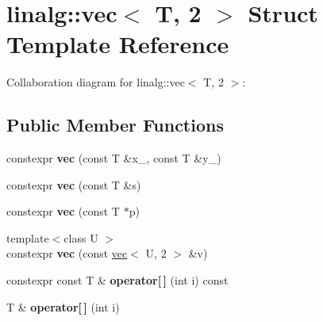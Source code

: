 \hypertarget{structlinalg_1_1vec_3_01T_00_012_01_4}{}\section{linalg\+:\+:vec$<$ T, 2 $>$ Struct Template Reference}
\label{structlinalg_1_1vec_3_01T_00_012_01_4}


Collaboration diagram for linalg\+:\+:vec$<$ T, 2 $>$\+:
\subsection*{Public Member Functions}
\begin{DoxyCompactItemize}
\item 
constexpr {\bfseries vec} (const T \&x\+\_\+, const T \&y\+\_\+)\hypertarget{structlinalg_1_1vec_3_01T_00_012_01_4_afc77c05c12561a24238f5efd47b0f9a1}{}\label{structlinalg_1_1vec_3_01T_00_012_01_4_afc77c05c12561a24238f5efd47b0f9a1}

\item 
constexpr {\bfseries vec} (const T \&s)\hypertarget{structlinalg_1_1vec_3_01T_00_012_01_4_ac565acdbde274b5456b157b07f1f90bd}{}\label{structlinalg_1_1vec_3_01T_00_012_01_4_ac565acdbde274b5456b157b07f1f90bd}

\item 
constexpr {\bfseries vec} (const T $\ast$p)\hypertarget{structlinalg_1_1vec_3_01T_00_012_01_4_a4704fbe1fda481d91d0c09d94a74e0c4}{}\label{structlinalg_1_1vec_3_01T_00_012_01_4_a4704fbe1fda481d91d0c09d94a74e0c4}

\item 
{\footnotesize template$<$class U $>$ }\\constexpr {\bfseries vec} (const \hyperlink{structlinalg_1_1vec}{vec}$<$ U, 2 $>$ \&v)\hypertarget{structlinalg_1_1vec_3_01T_00_012_01_4_aaf93006f7abc48c0a463ae7026c91664}{}\label{structlinalg_1_1vec_3_01T_00_012_01_4_aaf93006f7abc48c0a463ae7026c91664}

\item 
constexpr const T \& {\bfseries operator\mbox{[}$\,$\mbox{]}} (int i) const \hypertarget{structlinalg_1_1vec_3_01T_00_012_01_4_a8376cce5cd1a28d070a478685bad693e}{}\label{structlinalg_1_1vec_3_01T_00_012_01_4_a8376cce5cd1a28d070a478685bad693e}

\item 
T \& {\bfseries operator\mbox{[}$\,$\mbox{]}} (int i)\hypertarget{structlinalg_1_1vec_3_01T_00_012_01_4_a6a2959f645d7672cab804974cebcf996}{}\label{structlinalg_1_1vec_3_01T_00_012_01_4_a6a2959f645d7672cab804974cebcf996}

\end{DoxyCompactItemize}
